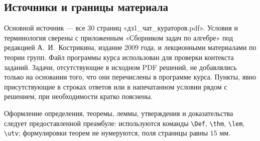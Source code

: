 \subsection*{Источники и границы материала}
Основной источник --- все $30$ страниц «дз1\_чат\_кураторов.pdf».
Условия и терминология сверены с приложенным «Сборником задач
по алгебре» под редакцией А.~И.~Кострикина, издание 2009 года,
и лекционными материалами по теории групп.
Файл программы курса использован для проверки контекста заданий.
Задачи, отсутствующие в исходном PDF решений, не добавлялись
только на основании того, что они перечислены в программе курса.
Пункты, явно присутствующие в строках ответов или в напечатанном
условии рядом с решением, при необходимости кратко пояснены.

Оформление определения, теоремы, леммы, утверждения и доказательства
следует предоставленной преамбуле: используются команды
\verb|\Def|, \verb|\thm|, \verb|\lem|, \verb|\utv|;
формулировки теорем не нумеруются, поля страницы равны $15$ мм.

